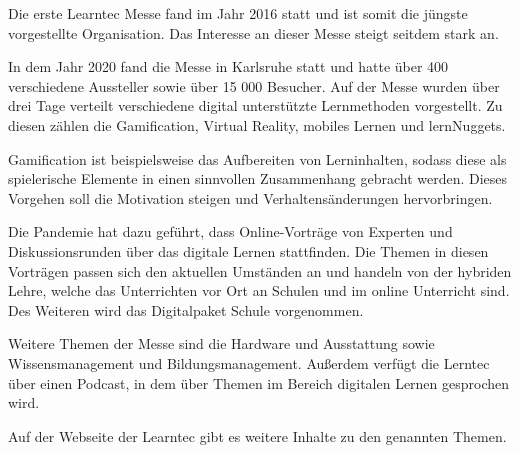 Die erste Learntec Messe fand im Jahr 2016 statt und ist somit die jüngste vorgestellte Organisation. Das Interesse an dieser Messe steigt seitdem stark an.
\autocite[Vgl.][]{KarlsruherMesseundKongressGmbH.3232021} 

In dem Jahr 2020 fand die Messe in Karlsruhe statt und hatte über 400 verschiedene Aussteller sowie über 15 000 Besucher. Auf der Messe wurden über drei Tage verteilt verschiedene digital unterstützte Lernmethoden vorgestellt. Zu diesen zählen die Gamification, Virtual Reality, mobiles Lernen und lernNuggets. \autocite[Vgl.][]{KarlsruherMesseundKongressGmbH.3232021}

Gamification ist beispielsweise das Aufbereiten von Lerninhalten, sodass diese als spielerische Elemente in einen sinnvollen Zusammenhang gebracht werden. Dieses Vorgehen soll die Motivation steigen und Verhaltensänderungen hervorbringen. \autocite[Vgl.][]{Prof.Dr.OliverBendel.7.1.2019}

Die Pandemie hat dazu geführt, dass Online-Vorträge von Experten und Diskussionsrunden über das digitale Lernen stattfinden. Die Themen in diesen Vorträgen passen sich den aktuellen Umständen an und handeln von der hybriden Lehre, welche das Unterrichten vor Ort an Schulen und im online Unterricht sind. Des Weiteren wird das Digitalpaket Schule vorgenommen. \autocite[Vgl.][]{KarlsruherMesseundKongressGmbH.3232021b} 

Weitere Themen der Messe sind die Hardware und Ausstattung sowie Wissensmanagement und Bildungsmanagement. Außerdem verfügt die Lerntec über einen Podcast, in dem über Themen im Bereich digitalen Lernen gesprochen wird. \autocite[Vgl.][]{KarlsruherMesseundKongressGmbH.432021} 

Auf der Webseite der Learntec gibt es weitere Inhalte zu den genannten Themen. 
